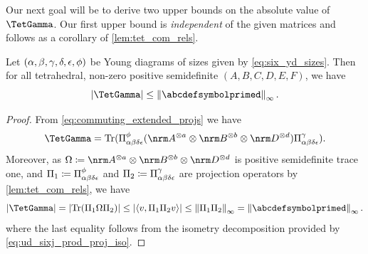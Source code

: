 \documentclass[notitlepage, 10pt]{article}
\begin{document}
Our next goal will be to derive two upper bounds on the absolute value of $\TetGamma$.
Our first upper bound is \textit{independent} of the given matrices and follows as a corollary of \cref{lem:tet_com_rels}.
\begin{cor}
    \label{cor:abd_indep_upper_bound}
    Let $(\alpha,\beta,\gamma,\delta,\epsilon,\phi)$ be Young diagrams of sizes given by \cref{eq:six_yd_sizes}.
    Then for all tetrahedral, non-zero positive semidefinite $(A,B,C,D,E,F)$, we have
    \begin{equation}
        \label{eq:tet_gamma_sixj_upper_bound}
        \abs{\TetGamma}
        \leq \norm{\abcdefsymbolprimed}_{\infty}.
    \end{equation}
\end{cor}
\begin{proof}
    From \cref{eq:commuting_extended_projs} we have 
    \begin{equation}
        \TetGamma
        =
        \Tr(\Pi^{\yf}_{\ya\yb\yd\ye}(\nrm A^{\ot a} \ot \nrm B^{\ot b} \ot \nrm D^{\ot d}) \Pi^{\yc}_{\ya\yb\yd\ye}).
    \end{equation}
    Moreover, as $\Omega \coloneqq \nrm A^{\ot a} \ot \nrm B^{\ot b} \ot \nrm D^{\ot d}$ is positive semidefinite trace one, 
    and $\Pi_1 \coloneqq \Pi^{\phi}_{\alpha\beta\delta\epsilon}$ and $\Pi_2 \coloneqq \Pi^{\gamma}_{\alpha\beta\delta\epsilon}$ are projection operators by \cref{lem:tet_com_rels}, we have
    \begin{equation}
        \abs{\TetGamma} = \abs{\Tr(\Pi_1 \Omega \Pi_2)} \leq \abs{\braket{v, \Pi_1 \Pi_2 v}} \leq \norm{\Pi_1\Pi_2}_{\infty} = \norm{\abcdefsymbolprimed}_{\infty}.
    \end{equation}
    where the last equality follows from the isometry decomposition provided by \cref{eq:ud_sixj_prod_proj_iso}.
\end{proof}
\end{document}
